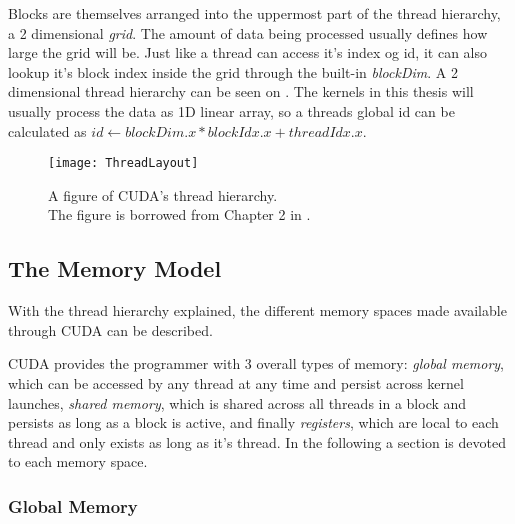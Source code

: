 
Blocks are themselves arranged into the uppermost part of the thread
hierarchy, a 2 dimensional \textit{grid}. The amount of data being
processed usually defines how large the grid will be. Just like a
thread can access it's index og id, it can also lookup it's block
index inside the grid through the built-in \textit{blockDim}. A 2
dimensional thread hierarchy can be seen on
. The kernels in this thesis will usually
process the data as 1D linear array, so a threads global id can be
calculated as $id \leftarrow blockDim.x * blockIdx.x + threadIdx.x$.

\begin{figure}
  \centering
  \texttt{[image: ThreadLayout]}
  \caption{A figure of CUDA's thread hierarchy.\\ The figure is borrowed
    from Chapter 2 in .}
  \label{fig:threadLayout}
\end{figure}




\subsection{The Memory Model}

With the thread hierarchy explained, the different memory spaces made
available through CUDA can be described.  

CUDA provides the programmer with 3 overall types of memory:
\textit{global memory}, which can be accessed by any thread at any
time and persist across kernel launches, \textit{shared memory}, which
is shared across all threads in a block and persists as long as a
block is active, and finally \textit{registers}, which are local to
each thread and only exists as long as it's thread. In the following
a section is devoted to each memory space.

\subsubsection{Global Memory}





